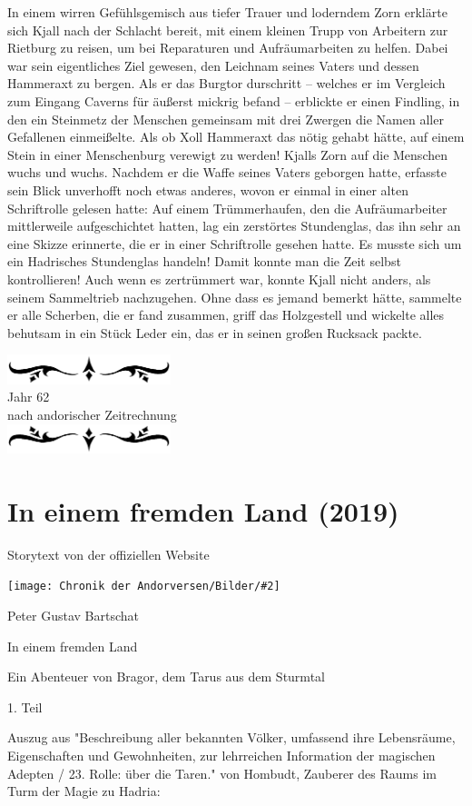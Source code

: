 \documentclass[10pt, a4paper, oneside]{book}
\newcommand{\fillbreak}{\vspace*{\fill}\columnbreak}
\newcommand{\storytext}[1]{%
    \section{#1}%
    \label{Storytext: #1}%
}
\newcommand{\bildmitts}[2][height=0.32\textwidth,width=0.48\textwidth,keepaspectratio]{%
    \begin{center}
        \texttt{[image: Chronik der Andorversen/Bilder/\#2]}
    \end{center}
}
\newcommand{\az}[1]{%
    \begin{center}
        \includegraphics[width=180px]{Chronik der Andorversen/verzierung1.png}\\
        {\Huge #1} \\
        {nach andorischer Zeitrechnung}\\
        \includegraphics[width=180px]{Chronik der Andorversen/verzierung2.png}
    \end{center}
    \extramarks{}{#1 a.Z.}
}
\begin{document}
\begin{multicols}{2}
In einem wirren Gefühlsgemisch aus tiefer Trauer und loderndem Zorn erklärte sich Kjall nach der Schlacht bereit, mit einem kleinen Trupp von Arbeitern zur Rietburg zu reisen, um bei Reparaturen und Aufräumarbeiten zu helfen. Dabei war sein eigentliches Ziel gewesen, den Leichnam seines Vaters und dessen Hammeraxt zu bergen. Als er das Burgtor durschritt – welches er im Vergleich zum Eingang Caverns für äußerst mickrig befand – erblickte er einen Findling, in den ein Steinmetz der Menschen gemeinsam mit drei Zwergen die Namen aller Gefallenen einmeißelte. Als ob Xoll Hammeraxt das nötig gehabt hätte, auf einem Stein in einer Menschenburg verewigt zu werden! Kjalls Zorn auf die Menschen wuchs und wuchs. Nachdem er die Waffe seines Vaters geborgen hatte, erfasste sein Blick unverhofft noch etwas anderes, wovon er einmal in einer alten Schriftrolle gelesen hatte: Auf einem Trümmerhaufen, den die Aufräumarbeiter mittlerweile aufgeschichtet hatten, lag ein zerstörtes Stundenglas, das ihn sehr an eine Skizze erinnerte, die er in einer Schriftrolle gesehen hatte. Es musste sich um ein Hadrisches Stundenglas handeln! Damit konnte man die Zeit selbst kontrollieren! Auch wenn es zertrümmert war, konnte Kjall nicht anders, als seinem Sammeltrieb nachzugehen. Ohne dass es jemand bemerkt hätte, sammelte er alle Scherben, die er fand zusammen, griff das Holzgestell und wickelte alles behutsam in ein Stück Leder ein, das er in seinen großen Rucksack packte.



\fillbreak
\az{Jahr 62}


\storytext{In einem fremden Land (2019)}

\begin{center}
    Storytext von der offiziellen Website
\end{center}

\bildmitts{In einem fremden Land Bild 1.jpg}

Peter Gustav Bartschat

In einem fremden Land

Ein Abenteuer von Bragor, dem Tarus aus dem Sturmtal

1. Teil\bigskip

Auszug aus "Beschreibung aller bekannten Völker, umfassend ihre Lebensräume, Eigenschaften und Gewohnheiten, zur lehrreichen Information der magischen Adepten / 23. Rolle: über die Taren." von Hombudt, Zauberer des Raums im Turm der Magie zu Hadria: 


\end{multicols}
\end{document}
